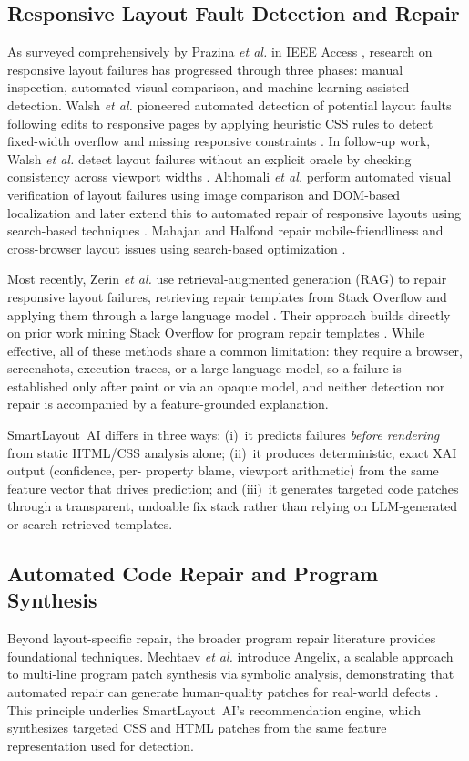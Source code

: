 \documentclass[conference]{IEEEtran}
\begin{document}
\subsection{Responsive Layout Fault Detection and Repair}
As surveyed comprehensively by Prazina \emph{et al.} in IEEE Access
\cite{prazina2023survey}, research on responsive layout failures has
progressed through three phases: manual inspection, automated visual
comparison, and machine-learning-assisted detection. Walsh \emph{et
al.} pioneered automated detection of potential layout faults following
edits to responsive pages by applying heuristic CSS rules to detect
fixed-width overflow and missing responsive constraints
\cite{walsh2015layout}. In follow-up work, Walsh \emph{et al.} detect
layout failures without an explicit oracle by checking consistency
across viewport widths \cite{walsh2017oracle}. Althomali \emph{et al.}
perform automated visual verification of layout failures using image
comparison and DOM-based localization
\cite{althomali2019visual} and later extend this to automated repair
of responsive layouts using search-based techniques
\cite{althomali2022repair}. Mahajan and Halfond repair
mobile-friendliness and cross-browser layout issues using search-based
optimization \cite{mahajan2018repair, mahajan2017xblayout}.

Most recently, Zerin \emph{et al.} use retrieval-augmented generation
(RAG) to repair responsive layout failures, retrieving repair templates
from Stack Overflow and applying them through a large language model
\cite{zerin2025ledefix}. Their approach builds directly on prior work
mining Stack Overflow for program repair templates \cite{liu2018sofix}.
While effective, all of these methods share a common limitation: they
require a browser, screenshots, execution traces, or a large language
model, so a failure is established only after paint or via an opaque
model, and neither detection nor repair is accompanied by a
feature-grounded explanation.

SmartLayout~AI differs in three ways: (i)~it predicts failures
\textit{before rendering} from static HTML/CSS analysis alone;
(ii)~it produces deterministic, exact XAI output (confidence, per-
property blame, viewport arithmetic) from the same feature vector that
drives prediction; and (iii)~it generates targeted code patches through
a transparent, undoable fix stack rather than relying on LLM-generated
or search-retrieved templates.

\subsection{Automated Code Repair and Program Synthesis}
Beyond layout-specific repair, the broader program repair literature
provides foundational techniques. Mechtaev \emph{et al.} introduce
Angelix, a scalable approach to multi-line program patch synthesis via
symbolic analysis, demonstrating that automated repair can generate
human-quality patches for real-world defects
\cite{mechtaev2016angelix}. This principle underlies SmartLayout~AI's
recommendation engine, which synthesizes targeted CSS and HTML patches
from the same feature representation used for detection.
\end{document}
